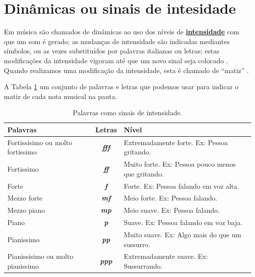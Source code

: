 \section{Dinâmicas ou sinais de intesidade}
\label{sec:sinaisintensidade}

Em música são chamados de dinâmicas ao uso dos níveis de 
\hyperref[sec:pos:Intensidade]{\textbf{intensidade}} com que um som é gerado;
as mudanças de intensidade são indicadas mediantes símbolos, 
ou as vezes substituídos por palavras italianas ou letras;
estas modificações da intensidade vigoram até que um novo sinal seja colocado \cite[pp. 213]{medteoria} \cite[pp. 117]{mascarenhascurso}.
Quando realizamos uma modificação da intensidade, esta é chamado de ``matiz''  \cite[pp. 213]{medteoria}.

A Tabela \ref{tab:palavras:intensidade} um conjunto de palavras e letras que podemos usar 
para indicar o matiz de cada nota musical na pauta. 
\begin{table}[h]
\centering
\begin{tabular}{|p{4cm}|c|p{7cm}|}
\hline
Palavras  & Letras & Nível \\ \hline
\hline 
Fortissisimo ou molto fortissimo  & \textbf{\textit{fff}}   & Extremadamente forte. Ex: Pessoa gritando. \\ \hline
Fortissimo    & \textbf{\textit{ff}}    & Muito forte. Ex: Pessoa pouco menos que gritando. \\  \hline
Forte         & \textbf{\textit{f}}     & Forte. Ex: Pessoa falando em voz alta. \\  \hline
Mezzo forte   & \textbf{\textit{mf}}    & Meio forte. Ex: Pessoa falando.\\  \hline
Mezzo piano   & \textbf{\textit{mp}}    & Meio suave. Ex: Pessoa falando. \\  \hline
Piano         & \textbf{\textit{p}}     & Suave. Ex: Pessoa falando em voz baja. \\  \hline
Pianissimo    & \textbf{\textit{pp}}    & Muito suave. Ex: Algo mais do que um sussurro. \\  \hline
Pianissisimo ou molto pianissimo  & \textbf{\textit{ppp}}   & Extremadamente suave. Ex: Sussurrando. \\  \hline
\end{tabular}
\caption{Palavras como sinais de intensidade.}
\label{tab:palavras:intensidade}
\end{table}

